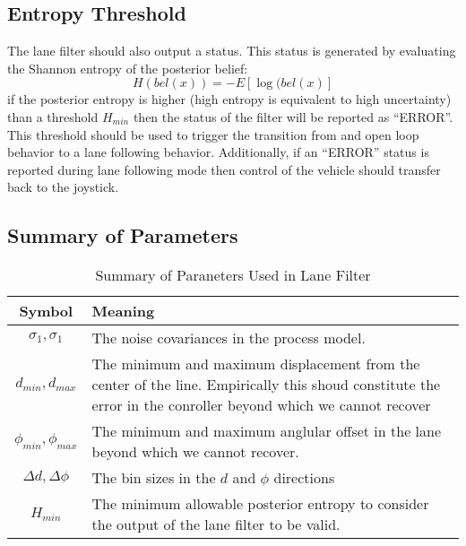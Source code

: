 \documentclass[12pt]{article}
\begin{document}
\subsection{Entropy Threshold}

The lane filter should also output a status. This status is generated by evaluating the Shannon entropy of the posterior belief:
\begin{equation}
H(bel(x)) = -E[\log(bel(x)]
\end{equation}
if the posterior entropy is higher (high entropy is equivalent to high uncertainty) than a threshold $H_{min}$ then the status of the filter will be reported as ``ERROR''.
This threshold should be used to trigger the transition from and open loop behavior to a lane following behavior. Additionally, if an ``ERROR'' status is reported during lane following mode then control of the vehicle should transfer back to the joystick. 


\subsection{Summary of Parameters}

\begin{table}[htb]
  \begin{tabular}{| c | p{10cm} |}
\hline
    {\bf Symbol} & {\bf Meaning} \\ \hline
    $\sigma_1,\sigma_1$ & The noise covariances in the process model. \\ \hline
    $d_{min},d_{max}$ & The minimum and maximum displacement from the center of the line. Empirically this shoud constitute the error in the conroller beyond which we cannot recover \\ \hline
    $\phi_{min},\phi_{max} $ & The minimum and maximum anglular offset in the lane beyond which we cannot recover.  \\ \hline
    $\Delta{d},\Delta{\phi}$ & The bin sizes in the $d$ and $\phi$ directions \\ \hline
    $H_{min}$ & The minimum allowable posterior entropy to consider the output of the lane filter to be valid.  \\ \hline
  \end{tabular}
  \caption{Summary of Paraneters Used in Lane Filter}
\end{table}
\end{document}
